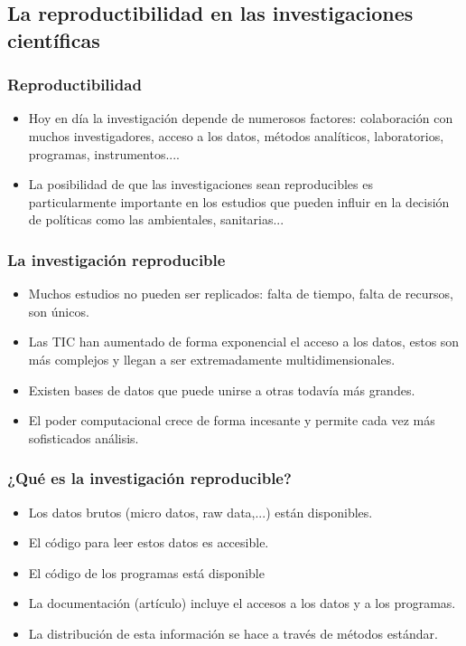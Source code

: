 \subsection{La reproductibilidad en las investigaciones científicas}
\begin{frame}
\frametitle{Reproductibilidad}
\begin{itemize}
 \item Hoy en día la investigación depende de numerosos factores: colaboración con muchos investigadores, acceso a los datos,
 métodos analíticos, laboratorios, programas, instrumentos....
\item  La posibilidad de que las investigaciones sean reproducibles es particularmente importante en los estudios que pueden influir en la decisión de políticas como las  ambientales, sanitarias...
\end{itemize}
\end{frame}



\begin{frame}
\frametitle{La investigación reproducible}
\begin{itemize}
\item Muchos estudios no pueden ser replicados: falta de tiempo, falta de recursos, son únicos.
\item Las TIC han aumentado de forma exponencial el acceso a los datos, estos son más complejos y llegan a ser extremadamente multidimensionales.
\item Existen bases de datos que puede unirse a otras todavía más grandes.
\item El poder computacional crece de forma incesante y  permite cada vez más sofisticados análisis.
\end{itemize}
\end{frame}


\begin{frame}
\frametitle{¿Qué es la investigación reproducible?}
\begin{itemize}
\item Los datos brutos (micro datos, raw data,...) están disponibles.
\item El código para leer estos datos es accesible.
\item El código de los programas está disponible
\item La documentación (artículo) incluye el accesos a los datos y a los programas.
\item La distribución de esta información se hace a través de métodos estándar.
\end{itemize}
\end{frame}

